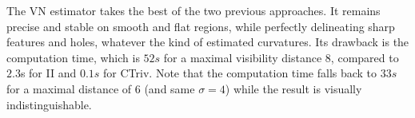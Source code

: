 The VN estimator takes the best of the two previous approaches. It
remains precise and stable on smooth and flat regions, while
perfectly delineating sharp features and holes, whatever the kind
of estimated curvatures. Its drawback is the computation time,
which is $52s$ for a maximal visibility distance $8$, compared to
$2.3$s for II and $0.1s$ for CTriv. Note that the computation time
falls back to $33s$ for a maximal distance of $6$ (and same
$\sigma=4$) while the result is visually indistinguishable.


\newcommand{\MyZoom}[1]{%
    \begin{tikzpicture}[spy using outlines={circle,magnification=1.8,size=2cm,connect spies}]
    \node[inner sep=0pt] {\pgfimage[width=0.2\linewidth]{#1}};
    \spy[overlay,blue] on (0.3,-0.18) in node at (-0.7,-0.7);
    \end{tikzpicture}}

\newcommand{\raiseboxsize}{10mm}

